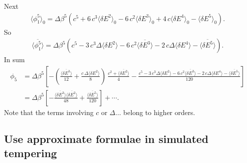 \documentclass[aip,jcp,preprint,notitlepage, superscriptaddress]{revtex4-1}
\begin{document}
Next
\begin{align*}
\langle \phi_1^5 \rangle_0
=
\Delta \beta^5
\left(
c^5 + 6 \, c^3 \langle \delta E^2 \rangle_0
-6 \, c^2 \langle \delta E^3 \rangle_0
+4 \, c \langle \delta E^4 \rangle_0
-\langle \delta E^5 \rangle_0
\right).
\end{align*}
So
\begin{align*}
\overline{ \langle \phi_1^5 \rangle }
=
\Delta \beta^5
\left(
c^5
- 3 \, c^3 \Delta \langle \delta E^2 \rangle
-6 \, c^2 \overline{ \langle \delta E^3 \rangle }
-2 \, c \Delta \langle \delta E^4 \rangle
-\overline{ \langle \delta E^5 \rangle }
\right).
\end{align*}
In sum
\begin{align*}
\phi_5
&=
\Delta \beta^5
\left[
  -\left(
    \frac{ \overline{ \langle \delta E^3 \rangle } }
         { 12 }
    +
    \frac{ c \, \Delta \langle \delta E^2 \rangle }
         { 8 }
  \right)
\, \frac{ c^2 + \overline{ \langle \delta E^2 \rangle } }
        { 4 }
-\frac{
  c^5
  - 3 \, c^3 \Delta \langle \delta E^2 \rangle
  -6 \, c^2 \overline{ \langle \delta E^3 \rangle }
  -2 \, c \Delta \langle \delta E^4 \rangle
  -\overline{ \langle \delta E^5 \rangle }
} { 120 }
\right] \\
&=
\Delta \beta^5
\left[
  -\frac{ \overline{ \langle \delta E^3 \rangle }
          \overline{ \langle \delta E^2 \rangle } }
        { 48 }
+\frac{
  \overline{ \langle \delta E^5 \rangle }
} { 120 }
\right] + \cdots.
\end{align*}
%
Note that the terms involving $c$ or $\Delta \dots$
belong to higher orders.




\subsection{Use approximate formulae in simulated tempering}
\end{document}

